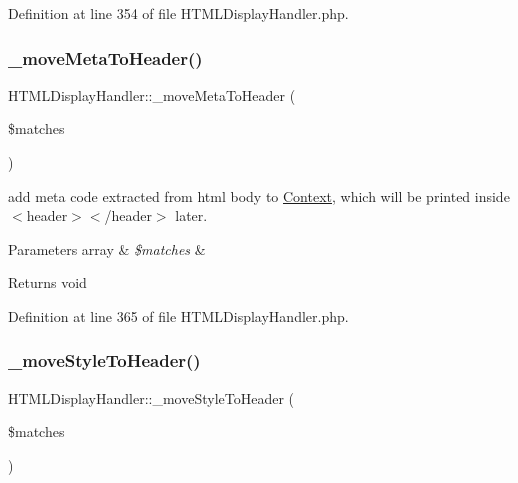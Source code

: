 Definition at line 354 of file H\+T\+M\+L\+Display\+Handler.\+php.

\mbox{\label{classHTMLDisplayHandler_a95922f4ce120e4cd0e08ed328282a003}} 
\subsubsection{\texorpdfstring{\+\_\+move\+Meta\+To\+Header()}{\_moveMetaToHeader()}}
{\footnotesize\ttfamily H\+T\+M\+L\+Display\+Handler\+::\+\_\+move\+Meta\+To\+Header (\begin{DoxyParamCaption}\item[{}]{\$matches }\end{DoxyParamCaption})}

add meta code extracted from html body to \hyperlink{classContext}{Context}, which will be printed inside $<$header$>$$<$/header$>$ later. 
\begin{DoxyParams}[1]{Parameters}
array & {\em \$matches} & \\
\hline
\end{DoxyParams}
\begin{DoxyReturn}{Returns}
void 
\end{DoxyReturn}


Definition at line 365 of file H\+T\+M\+L\+Display\+Handler.\+php.

\mbox{\label{classHTMLDisplayHandler_a68e7b6f173d231d71572509067a203f4}} 
\subsubsection{\texorpdfstring{\+\_\+move\+Style\+To\+Header()}{\_moveStyleToHeader()}}
{\footnotesize\ttfamily H\+T\+M\+L\+Display\+Handler\+::\+\_\+move\+Style\+To\+Header (\begin{DoxyParamCaption}\item[{}]{\$matches }\end{DoxyParamCaption})}

